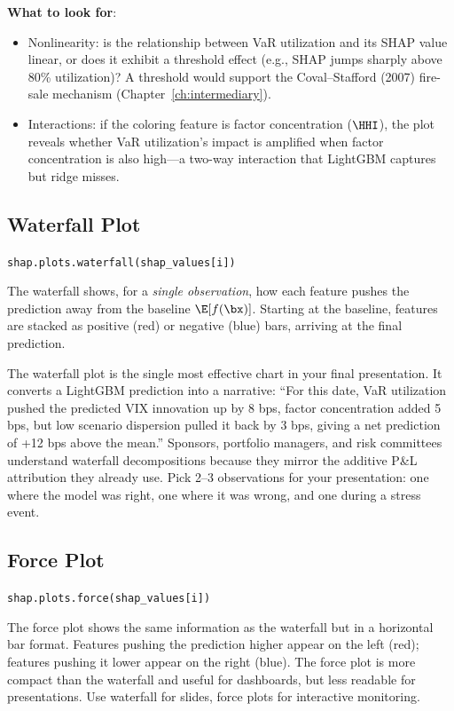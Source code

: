 \textbf{What to look for}:
\begin{itemize}[nosep]
  \item Nonlinearity: is the relationship between VaR utilization and its SHAP value linear, or does it exhibit a threshold effect (e.g., SHAP jumps sharply above 80\% utilization)?
  A threshold would support the Coval--Stafford (2007) fire-sale mechanism (Chapter~\ref{ch:intermediary}).
  \item Interactions: if the coloring feature is factor concentration ($\HHI$), the plot reveals whether VaR utilization's impact is amplified when factor concentration is also high---a two-way interaction that LightGBM captures but ridge misses.
\end{itemize}

\subsection{Waterfall Plot}

\texttt{shap.plots.waterfall(shap\_values[i])}

The waterfall shows, for a \emph{single observation}, how each feature pushes the prediction away from the baseline $\E[f(\bx)]$.
Starting at the baseline, features are stacked as positive (red) or negative (blue) bars, arriving at the final prediction.

\begin{keyidea}
The waterfall plot is the single most effective chart in your final presentation.
It converts a LightGBM prediction into a narrative: ``For this date, VaR utilization pushed the predicted VIX innovation up by 8 bps, factor concentration added 5 bps, but low scenario dispersion pulled it back by 3 bps, giving a net prediction of +12 bps above the mean.''
Sponsors, portfolio managers, and risk committees understand waterfall decompositions because they mirror the additive P\&L attribution they already use.
Pick 2--3 observations for your presentation: one where the model was right, one where it was wrong, and one during a stress event.
\end{keyidea}

\subsection{Force Plot}

\texttt{shap.plots.force(shap\_values[i])}

The force plot shows the same information as the waterfall but in a horizontal bar format.
Features pushing the prediction higher appear on the left (red); features pushing it lower appear on the right (blue).
The force plot is more compact than the waterfall and useful for dashboards, but less readable for presentations.
Use waterfall for slides, force plots for interactive monitoring.

